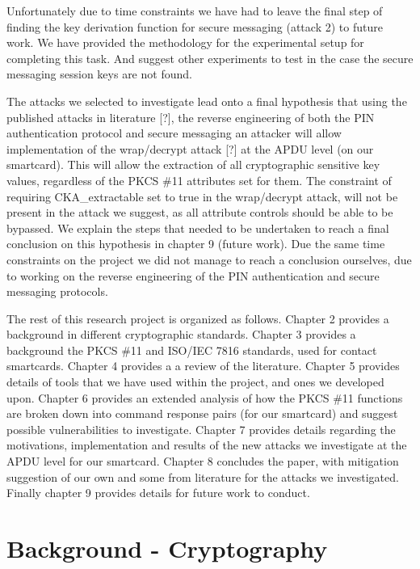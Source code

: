 \documentclass[bsc,frontabs,twoside,singlespacing,parskip,deptreport]{infthesis}     %
\begin{document}
Unfortunately due to time constraints we have had to leave the final step of finding the key derivation function for secure messaging (attack 2) to future work. We have provided the methodology for the experimental setup for completing this task. And suggest other experiments to test in the case the secure messaging session keys are not found.

The attacks we selected to investigate lead onto a final hypothesis that using the published attacks in literature [?], the reverse engineering of both the PIN authentication protocol and secure messaging an attacker will allow implementation of the wrap/decrypt attack [?] at the APDU level (on our smartcard). This will allow the extraction of all cryptographic sensitive key values, regardless of the PKCS \#11 attributes set for them. The constraint of requiring CKA\_extractable set to true in the wrap/decrypt attack, will not be present in the attack we suggest, as all attribute controls should be able to be bypassed. We explain the steps that needed to be undertaken to reach a final conclusion on this hypothesis in chapter 9 (future work). Due the same time constraints on the project we did not manage to reach a conclusion ourselves, due to working on the reverse engineering of the PIN authentication and secure messaging protocols.

The rest of this research project is organized as follows. Chapter 2 provides a background in different cryptographic standards. Chapter 3 provides a background the PKCS \#11 and ISO/IEC 7816 standards, used for contact smartcards. Chapter 4 provides a a review of the literature. Chapter 5 provides details of tools that we have used within the project, and ones we developed upon. Chapter 6 provides an extended analysis of how the PKCS \#11 functions are broken down into command response pairs (for our smartcard) and suggest possible vulnerabilities to investigate. Chapter 7 provides details regarding the motivations, implementation and results of the new attacks we investigate at the APDU level for our smartcard. Chapter 8 concludes the paper, with mitigation suggestion of our own and some from literature for the attacks we investigated. Finally chapter 9 provides details for future work to conduct.



\chapter{Background - Cryptography}
\end{document}
